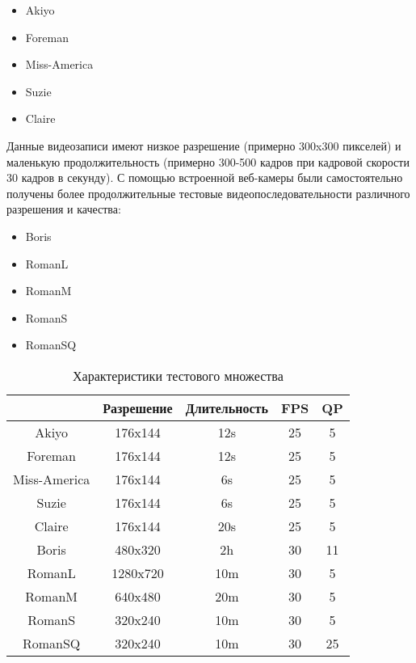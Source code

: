 \begin{itemize}
    \item Akiyo
    \item Foreman
    \item Miss-America
    \item Suzie
    \item Claire
\end{itemize}

Данные видеозаписи имеют низкое разрешение (примерно 300x300 пикселей)
и маленькую продолжительность (примерно 300-500 кадров при кадровой
скорости 30 кадров в секунду). С помощью встроенной веб-камеры были
самостоятельно получены более продолжительные тестовые видеопоследовательности
различного разрешения и качества:

\begin{itemize}
    \item Boris
    \item RomanL
    \item RomanM
    \item RomanS
    \item RomanSQ
\end{itemize}

\begin{table}[ht]
\caption{Характеристики тестового множества}
\centering
\begin{tabular}{| c | c | c | c | c |}
\hline
              & Разрешение & Длительность & FPS & QP \\ \hline
Akiyo         & 176x144    & 12s          & 25  & 5  \\ \hline
Foreman       & 176x144    & 12s          & 25  & 5  \\ \hline
Miss-America  & 176x144    & 6s           & 25  & 5  \\ \hline
Suzie         & 176x144    & 6s           & 25  & 5  \\ \hline
Claire        & 176x144    & 20s          & 25  & 5  \\ \hline
Boris         & 480x320    & 2h           & 30  & 11 \\ \hline
RomanL        & 1280x720   & 10m          & 30  & 5  \\ \hline
RomanM        & 640x480    & 20m          & 30  & 5  \\ \hline
RomanS        & 320x240    & 10m          & 30  & 5  \\ \hline
RomanSQ       & 320x240    & 10m          & 30  & 25 \\ \hline
\end{tabular}
\label{tab:videos}
\end{table}

